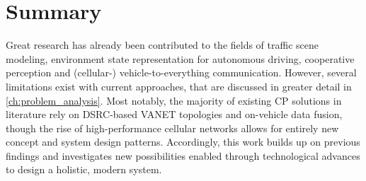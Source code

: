 \section{Summary}
\label{sec:related_work:summary}
Great research has already been contributed to the fields of traffic scene modeling, environment state representation for autonomous driving, cooperative perception and (cellular-) vehicle-to-everything communication. However, several limitations exist with current approaches, that are discussed in greater detail in \cref{ch:problem_analysis}. Most notably, the majority of existing CP solutions in literature rely on DSRC-based VANET topologies and on-vehicle data fusion, though the rise of high-performance cellular networks allows for entirely new concept and system design patterns. Accordingly, this work builds up on previous findings and investigates new possibilities enabled through technological advances to design a holistic, modern system. 